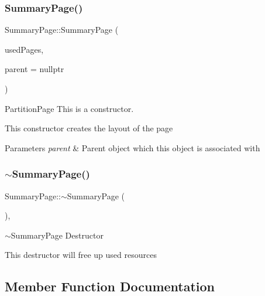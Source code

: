 \subsubsection{\texorpdfstring{Summary\+Page()}{SummaryPage()}}
{\footnotesize\ttfamily Summary\+Page\+::\+Summary\+Page (\begin{DoxyParamCaption}\item[{int}]{used\+Pages,  }\item[{Q\+Widget $\ast$}]{parent = {\ttfamily nullptr} }\end{DoxyParamCaption})}



Partition\+Page This is a constructor. 

This constructor creates the layout of the page 
\begin{DoxyParams}{Parameters}
{\em parent} & Parent object which this object is associated with \\
\hline
\end{DoxyParams}
\mbox{\label{class_summary_page_a93b880d988f9f85f28c3d239ce1457e0}} 
\subsubsection{\texorpdfstring{$\sim$\+Summary\+Page()}{~SummaryPage()}}
{\footnotesize\ttfamily Summary\+Page\+::$\sim$\+Summary\+Page (\begin{DoxyParamCaption}\item[{void}]{ }\end{DoxyParamCaption})\hspace{0.3cm}{\ttfamily [override]}, {\ttfamily [virtual]}}



$\sim$\+Summary\+Page Destructor 

This destructor will free up used resources 

\subsection{Member Function Documentation}
\mbox{\label{class_summary_page_af31d12dc5ed2c917c8f65fe7790b661f}} 
